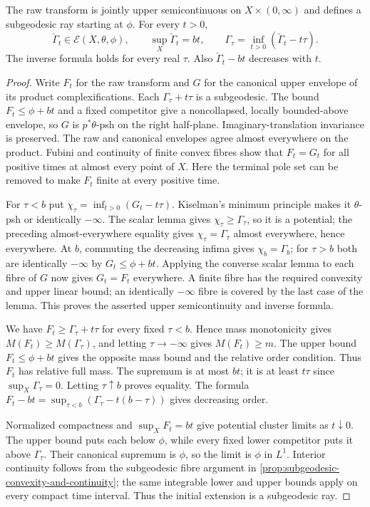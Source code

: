 \begin{proposition}\label{prop:test-curve-legendre-subgeodesic}
The raw transform is jointly upper semicontinuous on $X\times(0,\infty)$ and defines a subgeodesic ray starting at $\phi$. For every $t>0$,
\[
 \check\Gamma_t\in\mathcal E(X,\theta,\phi),\qquad
 \sup_X\check\Gamma_t=bt,\qquad
 \Gamma_\tau=\inf_{t>0}(\check\Gamma_t-t\tau).
\]
The inverse formula holds for every real $\tau$. Also $\check\Gamma_t-bt$ decreases with $t$.
\end{proposition}
\begin{proof}
Write $F_t$ for the raw transform and $G$ for the canonical upper envelope of its product complexifications. Each $\Gamma_\tau+t\tau$ is a subgeodesic. The bound $F_t\leq\phi+bt$ and a fixed competitor give a noncollapsed, locally bounded-above envelope, so $G$ is $p^*\theta$-psh on the right half-plane. Imaginary-translation invariance is preserved. The raw and canonical envelopes agree almost everywhere on the product. Fubini and continuity of finite convex fibres show that $F_t=G_t$ for all positive times at almost every point of $X$. Here the terminal pole set can be removed to make $F_t$ finite at every positive time.

For $\tau<b$ put $\chi_\tau=\inf_{t>0}(G_t-t\tau)$. Kiselman's minimum principle makes it $\theta$-psh or identically $-\infty$. The scalar lemma gives $\chi_\tau\geq\Gamma_\tau$, so it is a potential; the preceding almost-everywhere equality gives $\chi_\tau=\Gamma_\tau$ almost everywhere, hence everywhere. At $b$, commuting the decreasing infima gives $\chi_b=\Gamma_b$; for $\tau>b$ both are identically $-\infty$ by $G_t\leq\phi+bt$. Applying the converse scalar lemma to each fibre of $G$ now gives $G_t=F_t$ everywhere. A finite fibre has the required convexity and upper linear bound; an identically $-\infty$ fibre is covered by the last case of the lemma. This proves the asserted upper semicontinuity and inverse formula.

We have $F_t\geq\Gamma_\tau+t\tau$ for every fixed $\tau<b$. Hence mass monotonicity gives $M(F_t)\geq M(\Gamma_\tau)$, and letting $\tau\to-\infty$ gives $M(F_t)\geq m$. The upper bound $F_t\leq\phi+bt$ gives the opposite mass bound and the relative order condition. Thus $F_t$ has relative full mass. The supremum is at most $bt$; it is at least $t\tau$ since $\sup_X\Gamma_\tau=0$. Letting $\tau\uparrow b$ proves equality. The formula
$F_t-bt=\sup_{\tau<b}(\Gamma_\tau-t(b-\tau))$
gives decreasing order.

Normalized compactness and $\sup_XF_t=bt$ give potential cluster limits as $t\downarrow0$. The upper bound puts each below $\phi$, while every fixed lower competitor puts it above $\Gamma_\tau$. Their canonical supremum is $\phi$, so the limit is $\phi$ in $L^1$. Interior continuity follows from the subgeodesic fibre argument in \cref{prop:subgeodesic-convexity-and-continuity}; the same integrable lower and upper bounds apply on every compact time interval. Thus the initial extension is a subgeodesic ray.
\end{proof}

